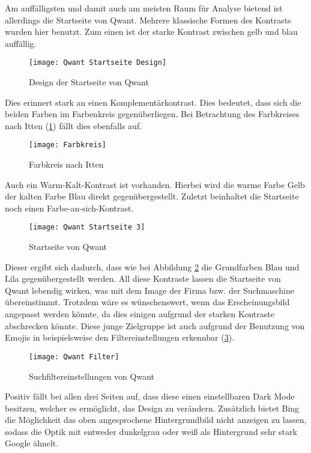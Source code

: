 Am auffälligsten und damit auch am meisten Raum für Analyse bietend ist allerdings die Startseite von Qwant. Mehrere
klassische Formen des Kontrasts wurden hier benutzt. Zum einen ist der starke Kontrast zwischen gelb und blau auffällig.
\begin{figure}[h]
    \centering
    \texttt{[image: Qwant Startseite Design]}
    \caption{Design der Startseite von Qwant}
\end{figure}
Dies erinnert stark an einen Komplementärkontrast. Dies bedeutet, dass sich die beiden Farben im Farbenkreis gegenüberliegen\cite[Seite 33]{Maulhardt.20220513}.
Bei Betrachtung des Farbkreises nach Itten (\ref{fig:farbkreis}) fällt dies ebenfalls auf.
\begin{figure}[h]
    \centering
    \texttt{[image: Farbkreis]}
    \caption{Farbkreis nach Itten\cite{Farbkreis}}
    \label{fig:farbkreis}
\end{figure}
Auch ein
Warm-Kalt-Kontrast ist vorhanden. Hierbei wird die warme Farbe Gelb der kalten Farbe Blau direkt gegenübergestellt\cite[Seite 34]{Maulhardt.20220513}.
Zuletzt beinhaltet die Startseite noch einen Farbe-an-sich-Kontrast.
\begin{figure}[h]
    \centering
    \texttt{[image: Qwant Startseite 3]}
    \caption{Startseite von Qwant}
    \label{fig:qwantstartseite3}
\end{figure}
Dieser ergibt sich dadurch,
dass wie bei Abbildung \ref{fig:qwantstartseite3} die Grundfarben Blau und Lila gegenübergestellt werden\cite[Seite 38]{Maulhardt.20220513}. All diese Kontraste
lassen die Startseite von Qwant lebendig wirken, was mit dem Image der Firma bzw. der Suchmaschine übereinstimmt.
Trotzdem wäre es wünschenswert, wenn das Erscheinungsbild angepasst werden könnte, da dies einigen aufgrund der starken
Kontraste abschrecken könnte. Diese junge Zielgruppe ist auch aufgrund der Benutzung von Emojis in beispielsweise den
Filtereinstellungen erkennbar (\ref{fig:qwantfilter}).
\begin{figure}[h]
    \centering
    \texttt{[image: Qwant Filter]}
    \caption{Suchfiltereinstellungen von Qwant}
    \label{fig:qwantfilter}
\end{figure}

Positiv fällt bei allen drei Seiten auf, dass diese einen einstellbaren Dark Mode besitzen, welcher es ermöglicht, das
Design zu verändern. Zusätzlich bietet Bing die Möglichkeit das oben angesprochene Hintergrundbild nicht anzeigen zu lassen,
sodass die Optik mit entweder dunkelgrau oder weiß als Hintergrund sehr stark Google ähnelt.

